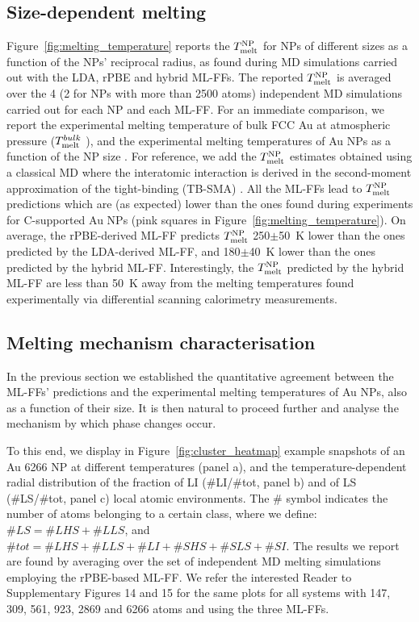 \documentclass[%
aip,
 amsmath,amssymb,
 reprint,
]{revtex4-1}
\newcommand*\subt[1]{_{\textnormal{#1}}}
\newcommand*\supt[1]{^{\textnormal{#1}}}
\begin{document}
\subsection*{Size-dependent melting}
\label{subsec:size_melting}
%
Figure~\ref{fig:melting_temperature} reports the $T\subt{melt}\supt{NP}$ for NPs of different sizes as a function of the NPs' reciprocal radius, as found during MD simulations carried out with the LDA, rPBE and hybrid ML-FFs. 
%
The reported $T\subt{melt}\supt{NP}$ is averaged over the 4 (2 for NPs with more than 2500 atoms) independent MD simulations carried out for each NP and each ML-FF.
%
For an immediate comparison, we report the experimental melting temperature of bulk FCC Au at atmospheric pressure ($T\subt{melt}^{bulk}$ ), and the experimental melting temperatures of Au NPs as a function of the NP size \cite{duan2018influence, Foster2019}.
%
For reference, we add the $T\subt{melt}\supt{NP}$ estimates obtained using a classical MD where the interatomic interaction is derived in the second-moment approximation of the tight-binding (TB-SMA) \cite{Delgado-Callico2020}.
%
All the ML-FFs lead to $T\subt{melt}\supt{NP}$ predictions which are (as expected) lower than the ones found during experiments for C-supported Au NPs (pink squares in Figure~\ref{fig:melting_temperature}).
%
On average, the rPBE-derived ML-FF predicts $T\subt{melt}\supt{NP}$ 250$\pm$50~K lower than the ones predicted by the LDA-derived ML-FF, and 180$\pm$40~K lower than the ones predicted by the hybrid ML-FF.
%
Interestingly, the $T\subt{melt}\supt{NP}$ predicted by the hybrid ML-FF are less than 50~K away from the melting temperatures found experimentally via differential scanning calorimetry measurements. \cite{duan2018influence}

\subsection*{Melting mechanism characterisation}
\label{subsec:melting_mechanism}
%
In the previous section we established the quantitative agreement between the ML-FFs' predictions and the experimental melting temperatures of Au NPs, also as a function of their size.
%
It is then natural to proceed further and analyse the mechanism by which phase changes occur.
%

To this end, we display in Figure~\ref{fig:cluster_heatmap}  example snapshots of an Au 6266 NP at different temperatures (panel a), and the temperature-dependent radial distribution of the fraction of LI (\#LI/\#tot, panel b) and of LS (\#LS/\#tot, panel c) local atomic environments.
%
The \# symbol indicates the number of atoms belonging to a certain class, where we define:
$\#LS=\#LHS+\#LLS$, and $\#tot=\#LHS+\#LLS+\#LI+\#SHS+\#SLS+\#SI.$
%
The results we report are found by averaging over the set of independent MD melting simulations employing the rPBE-based ML-FF.
%
We refer the interested Reader to Supplementary Figures 14 and 15 for the same plots for all systems with 147, 309, 561, 923, 2869 and 6266 atoms and using the three ML-FFs.
%
\end{document}
